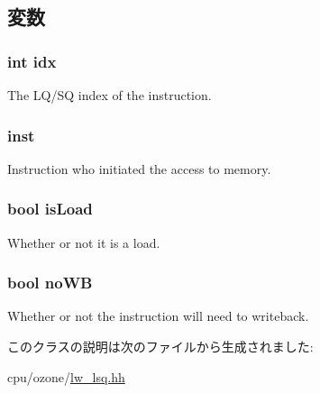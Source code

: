 \subsection{変数}
\hypertarget{classOzoneLWLSQ_1_1LSQSenderState_ae40354a1051342eb5a9db005715dcfa9}{
\subsubsection[{idx}]{\setlength{\rightskip}{0pt plus 5cm}int {\bf idx}}}
\label{classOzoneLWLSQ_1_1LSQSenderState_ae40354a1051342eb5a9db005715dcfa9}
The LQ/SQ index of the instruction. \hypertarget{classOzoneLWLSQ_1_1LSQSenderState_af5d4fb974eeb4507d4c837d365d0cefc}{
\subsubsection[{inst}]{ {\bf inst}}}
\label{classOzoneLWLSQ_1_1LSQSenderState_af5d4fb974eeb4507d4c837d365d0cefc}
Instruction who initiated the access to memory. \hypertarget{classOzoneLWLSQ_1_1LSQSenderState_aaa492a23dd827a27baf0e8abcf09e391}{
\subsubsection[{isLoad}]{\setlength{\rightskip}{0pt plus 5cm}bool {\bf isLoad}}}
\label{classOzoneLWLSQ_1_1LSQSenderState_aaa492a23dd827a27baf0e8abcf09e391}
Whether or not it is a load. \hypertarget{classOzoneLWLSQ_1_1LSQSenderState_aee33f1eef98f14502c88334f70e6c03d}{
\subsubsection[{noWB}]{\setlength{\rightskip}{0pt plus 5cm}bool {\bf noWB}}}
\label{classOzoneLWLSQ_1_1LSQSenderState_aee33f1eef98f14502c88334f70e6c03d}
Whether or not the instruction will need to writeback. 

このクラスの説明は次のファイルから生成されました:\begin{DoxyCompactItemize}
\item 
cpu/ozone/\hyperlink{lw__lsq_8hh}{lw\_\-lsq.hh}\end{DoxyCompactItemize}
